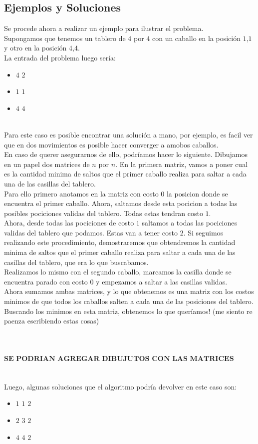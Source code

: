 \subsection{Ejemplos y Soluciones}
Se procede ahora a realizar un ejemplo para ilustrar el problema.
\\
Supongamos que tenemos un tablero de $4$ por $4$ con un caballo en la posici\'on $1$,$1$ y otro en la posici\'on $4$,$4$.
\\
La entrada del problema luego ser\'ia:
\\
\begin{itemize}
\item $4$ $2$ 
\item $1$ $1$
\item $4$ $4$
\end{itemize}
\\
Para este caso es posible encontrar una soluci\'on a mano, por ejemplo, es facil ver que en dos movimientos es posible hacer converger a amobos caballos.
\\
En caso de querer asegurarnos de ello, podr\'iamos hacer lo siguiente. Dibujamos en un papel dos matrices de $n$ por $n$. En la primera matriz, vamos a poner cual es la cantidad minima de saltos que el primer caballo realiza para saltar a cada una de las casillas del tablero. 
\\
Para ello primero anotamos en la matriz con costo $0$ la posicion donde se encuentra el primer caballo. Ahora, saltamos desde esta pocicion a todas las posibles pociciones validas del tablero. Todas estas tendran costo $1$.
\\
Ahora, desde todas las pociciones de costo $1$ saltamos a todas las pociciones validas del tablero que podamos. Estas van a tener costo $2$. Si seguimos realizando este procedimiento, demostraremos que obtendremos la cantidad minima de saltos que el primer caballo realiza para saltar a cada una de las casillas del tablero, que era lo que buscabamos.
\\
Realizamos lo mismo con el segundo caballo, marcamos la casilla donde se encuentra parado con costo $0$ y empezamos a saltar a las casillas validas.
\\
Ahora sumamos ambas matrices, y lo que obtenemos es una matriz con los costos minimos de que todos los caballos salten a cada una de las posiciones del tablero.
\\
Buscando los minimos en esta matriz, obtenemos lo que quer\'iamos! (me siento re paenza escribiendo estas cosas)
\\
\\
\\
\\
$$\textbf{SE PODRIAN AGREGAR DIBUJUTOS CON LAS MATRICES PARA QUE QUEDE CLARO}$$
\\
\\
Luego, algunas soluciones que el algoritmo podr\'ia devolver en este caso son:
\\
\begin{itemize}
\item $1$ $1$ $2$ 
\item $2$ $3$ $2$
\item $4$ $4$ $2$ 
\end{itemize}

